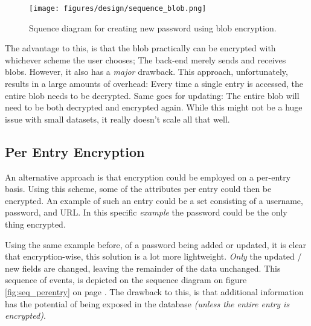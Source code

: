 			\begin{figure}[h!]
				\centering
				\texttt{[image: figures/design/sequence\_blob.png]}
				\caption{Squence diagram for creating new password using blob encryption.}
				\label{fig:seq_blob}
			\end{figure}

			The advantage to this, is that the blob practically can be encrypted with whichever scheme the user chooses; The back-end merely sends and receives blobs. However, it also has a \emph{major} drawback. This approach, unfortunately, results in a large amounts of overhead: Every time a single entry is accessed, the entire blob needs to be decrypted. Same goes for updating: The entire blob will need to be both decrypted and encrypted again. While this might not be a huge issue with small datasets, it really doesn't scale all that well.

		\subsection{Per Entry Encryption}
			An alternative approach is that encryption could be employed on a per-entry basis. Using this scheme, some of the attributes per entry could then be encrypted. An example of such an entry could be a set consisting of a username, password, and URL. In this specific \emph{example} the password could be the only thing encrypted. 

			Using the same example before, of a password being added or updated, it is clear that encryption-wise, this solution is a lot more lightweight. \emph{Only} the updated / new fields are changed, leaving the remainder of the data unchanged. This sequence of events, is depicted on the sequence diagram on figure \ref{fig:seq_perentry} on page \pageref{fig:seq_perentry}. The drawback to this, is that additional information has the potential of being exposed in the database \emph{(unless the entire entry is encrypted)}.


